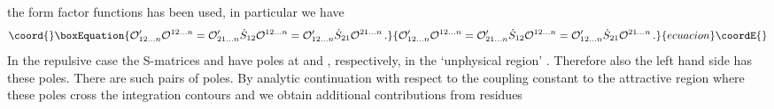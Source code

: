 \documentclass[a4paper,a4paper]{article}
\begin{document}
the form factor functions has been used, in particular we have 
\begin{equation}\coord{}\boxEquation{
\mathcal{O}_{12\dots n}^{\prime }\mathcal{O}^{12\dots n}=\mathcal{O}
_{21\dots n}^{\prime }\dot{S}_{12}\mathcal{O}^{12\dots n}=\mathcal{O}
_{12\dots n}^{\prime }\dot{S}_{21}\mathcal{O}^{21\dots n}\,.  \label{b1.80}
}{
\mathcal{O}_{12\dots n}^{\prime }\mathcal{O}^{12\dots n}=\mathcal{O}
_{21\dots n}^{\prime }\dot{S}_{12}\mathcal{O}^{12\dots n}=\mathcal{O}
_{12\dots n}^{\prime }\dot{S}_{21}\mathcal{O}^{21\dots n}\,.  }{ecuacion}\coordE{}\end{equation}
In the repulsive case the S-matrices \coordHE{} and \coordHE{} have
poles at \coordHE{} and \coordHE{}, respectively, in the
`unphysical region' \coordHE{}. Therefore also the left hand side has
these poles. There are \coordHE{} such pairs of poles. By analytic
continuation with respect to the coupling constant to the attractive region
where \coordHE{} these poles cross the integration contours and we
obtain additional contributions from residues 
\end{document}

